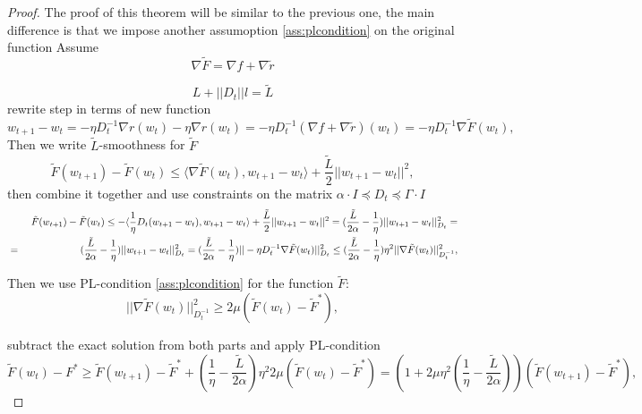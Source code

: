 \documentclass{article}
\begin{document}
\begin{proof}
    The proof of this theorem will be similar to the previous one, the main difference is that we impose another assumoption \ref{ass:plcondition} on the original function 
    Assume 
    \begin{equation*}
    \nabla \tilde{F} = \nabla f + \nabla \tilde{r}    
    \end{equation*}
    
    \begin{equation*}
    L + ||D_t||l = \tilde{L}        
    \end{equation*}
    rewrite step in terms of new function
    \begin{equation*}
    w_{t+1} - w_t = -\eta D_t^{-1} \nabla r(w_t) - \eta \nabla r(w_t) = -\eta D_t^{-1} (\nabla f + \nabla \tilde{r})(w_t) = -\eta D_t^{-1} \nabla \tilde{F}(w_t),
    \end{equation*}
    Then we write $\tilde{L}$-smoothness for $\tilde{F}$ 
    \begin{equation*}
        \tilde{F}(w_{t+1}) - \tilde{F}(w_t) \leq  \langle \nabla \tilde{F}(w_t), w_{t+1} - w_t \rangle + \frac{\tilde{L}}{2} ||w_{t+1} - w_t||^2,
    \end{equation*}
    then combine it together and use constraints on the matrix $\alpha \cdot I \preccurlyeq D_t \preccurlyeq \Gamma \cdot I$
    \begin{eqnarray*}
&& \        \tilde{F}(w_{t+1}) - \tilde{F}(w_t) \leq - \langle \frac{1}{\eta} D_t(w_{t+1} - w_t), w_{t+1} - w_t \rangle + \frac{\tilde{L}}{2} ||w_{t+1} - w_t||^2 = (\frac{\tilde{L}}{2 \alpha} - \frac{1}{\eta}) ||w_{t+1} - w_t||^2_{D_t} =
\notag\\& =&
(\frac{\tilde{L}}{2 \alpha} - \frac{1}{\eta}) ||w_{t+1} - w_t||^2_{D_t} = (\frac{\tilde{L}}{2 \alpha} - \frac{1}{\eta}) ||-\eta D_t^{-1} \nabla \tilde{F}(w_t)||_{D_t}^2  \leq (\frac{\tilde{L}}{2 \alpha} - \frac{1}{\eta}) \eta^2 ||\nabla \tilde{F}(w_t)||^2_{D_t^{-1}},
\end{eqnarray*}

    Then we use PL-condition \ref{ass:plcondition} for the function $\tilde{F}$:
    \begin{equation*}
        ||\nabla \tilde{F}(w_t)||_{D_t^{-1}}^2 \geq 2 \mu (\tilde{F}(w_t) - \tilde{F}^*),
    \end{equation*}
    
    subtract the exact solution from both parts and apply PL-condition
    \begin{equation*}
    \tilde{F}(w_{t}) -  F^* \ge \tilde{F}(w_{t+1}) - \tilde{F}^* + (\frac{1}{\eta} - \frac{\tilde{L}}{2 \alpha}) \eta^2 2 \mu (\tilde{F}(w_t) - \tilde{F}^*) = \left( 1 +  2 \mu \eta^2(\frac{1}{\eta} - \frac{\tilde{L}}{2 \alpha}) \right) (\tilde{F}(w_{t+1}) - \tilde{F}^*),
    \end{equation*}


\end{proof}
\end{document}
